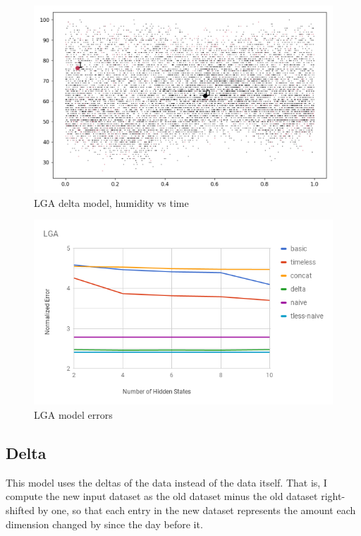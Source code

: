 \documentclass[a4paper]{article}
\begin{document}
\begin{figure}[t]
  \centering
  \includegraphics[width=\linewidth]{../png/models/LGA-delta-humidity2.png}
  \caption{LGA delta model, humidity vs time}
  \label{fig:LGA_delta}
\end{figure}

\begin{figure}[t]
  \centering
  \includegraphics[width=\linewidth]{../png/analysis/LGA.png}
  \caption{LGA model errors}
  \label{fig:LGA_models}
\end{figure}



\subsection{Delta}


This model uses the deltas of the data instead of the data itself. That is, I compute the new input dataset as the old dataset minus the old dataset right-shifted by one, so that each entry in the new dataset represents the amount each dimension changed by since the day before it.
\end{document}
